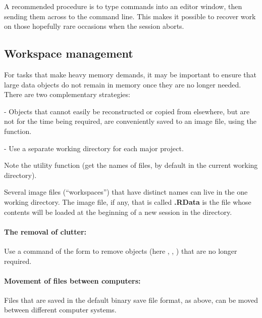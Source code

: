 A recommended procedure
is to type commands into an editor window,
then sending them across to the command line. This makes it possible
to recover work on those hopefully rare occasions when the
session aborts.

\subsection{Workspace management}

For tasks that make heavy memory demands, it may be important to
ensure that large data objects do not remain in memory once they are
no longer needed. There are two complementary strategies:
\begin{itemizz}
\item[-] Objects that cannot easily be reconstructed or copied from elsewhere,
but are not for the time being required, are conveniently saved
to an image file, using the  function.

\item[-] Use a separate working directory for each major project.
\end{itemizz}

Note the utility function   (get the names of files, by
default in the current working directory).

Several image files (``workspaces'') that have distinct names can live
in the one working directory.  The image file, if any, that is called
\textbf{.RData} is the file whose contents will be loaded at the
beginning of a new session in the directory.

\paragraph{The removal of clutter:}
Use a command of the form  to remove
objects (here , , ) that are no longer
required.

\paragraph{Movement of files between computers:}\label{ss:dump}
Files that are saved in the default binary save file format, as above,
can be moved between different computer systems.

